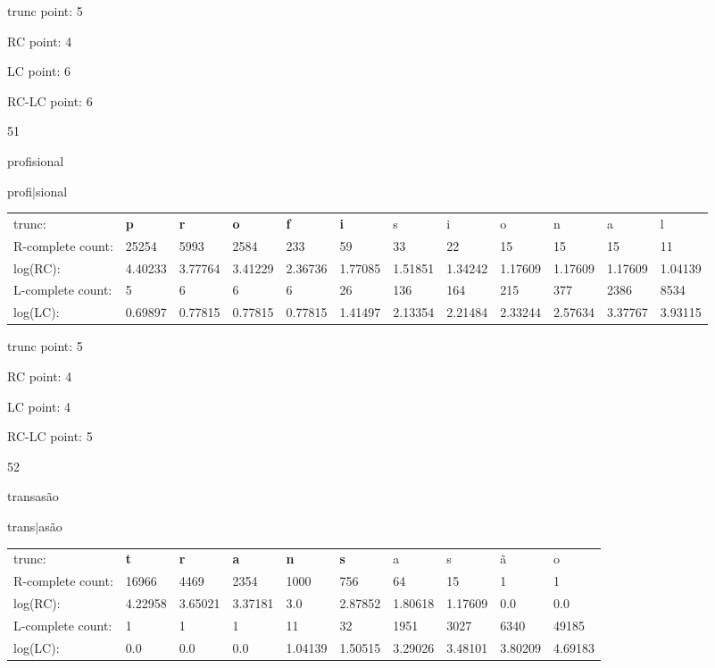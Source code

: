 \documentclass{article}
\begin{document}
trunc point: 5

RC point: 4

LC point: 6

RC-LC point: 6

\vspace{3em}



51

profisional

profi$|$sional

\vspace{1em}

\begin{tabular}{l|lllllllllll}

trunc: & {\color{red}\bf p} & {\color{red}\bf r} & {\color{red}\bf o} & {\color{red}\bf f} & {\color{red}\bf i} & s & i & o & n & a & l \\ 
R-complete count: & 25254 & 5993 & 2584 & 233 & 59 & 33 & 22 & 15 & 15 & 15 & 11 \\ 
log(RC): & 4.40233 & 3.77764 & 3.41229 & 2.36736 & 1.77085 & 1.51851 & 1.34242 & 1.17609 & 1.17609 & 1.17609 & 1.04139 \\ 
L-complete count: & 5 & 6 & 6 & 6 & 26 & 136 & 164 & 215 & 377 & 2386 & 8534 \\ 
log(LC): & 0.69897 & 0.77815 & 0.77815 & 0.77815 & 1.41497 & 2.13354 & 2.21484 & 2.33244 & 2.57634 & 3.37767 & 3.93115 \\ 
\end{tabular}

trunc point: 5

RC point: 4

LC point: 4

RC-LC point: 5

\vspace{3em}



52

transasão

trans$|$asão

\vspace{1em}

\begin{tabular}{l|lllllllll}

trunc: & {\color{red}\bf t} & {\color{red}\bf r} & {\color{red}\bf a} & {\color{red}\bf n} & {\color{red}\bf s} & a & s & ã & o \\ 
R-complete count: & 16966 & 4469 & 2354 & 1000 & 756 & 64 & 15 & 1 & 1 \\ 
log(RC): & 4.22958 & 3.65021 & 3.37181 & 3.0 & 2.87852 & 1.80618 & 1.17609 & 0.0 & 0.0 \\ 
L-complete count: & 1 & 1 & 1 & 11 & 32 & 1951 & 3027 & 6340 & 49185 \\ 
log(LC): & 0.0 & 0.0 & 0.0 & 1.04139 & 1.50515 & 3.29026 & 3.48101 & 3.80209 & 4.69183 \\ 
\end{tabular}
\end{document}
